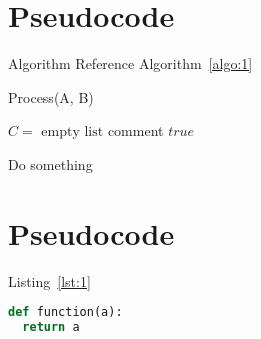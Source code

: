 \documentclass[english]{article}
\begin{document}
\clearpage
\pagebreak
\section{Pseudocode}

\par Algorithm Reference Algorithm~\ref{algo:1}

\begin{algorithm}
  \caption{Process(A, B)}\label{algo:1}
  \begin{algorithmic}[1]

    \State $C = \text{ empty list}$ \Comment comment
    \State \Return $true$
    \Else

    \State Do something
    \EndWhile

    \EndIf

  \end{algorithmic}
\end{algorithm}

\clearpage
\pagebreak
\section{Pseudocode}

Listing~\ref{lst:1}

\begin{lstlisting}[language=Python, caption=Caption, label=lst:1]
def function(a):
  return a
\end{lstlisting}


\clearpage
\pagebreak
\printbibliography
\end{document}

